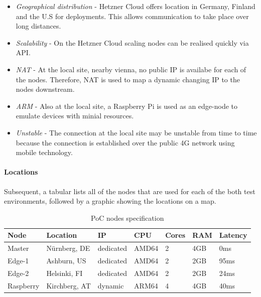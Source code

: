 \documentclass[MSC,Master,english]{twbook}%
\begin{document}
\begin{itemize}
    \item \textit{Geographical distribution} - Hetzner Cloud offers location in Germany, Finland and the U.S for deployments. This allows communication to take place over long distances.
    \item \textit{Scalability} - On the Hetzner Cloud scaling nodes can be realised quickly via \ac{API}.
    \item \textit{\ac{NAT}} - At the local site, nearby vienna, no public IP is availabe for each of the nodes. Therefore, \ac{NAT} is used to map a dynamic changing IP to the nodes downstream.
    \item \textit{\ac{ARM}} - Also at the local site, a Raspberry Pi is used as an edge-node to emulate devices with minial resources.
    \item \textit{Unstable} - The connection at the local site may be unstable from time to time because the connection is established over the public 4G network using mobile technology.
\end{itemize}

\paragraph{Locations} Subsequent, a tabular lists all of the nodes that are used for each of the both test environments, followed by a graphic showing the locations on a map.

\begin{table}[ht]
    \begin{center}
        \begin{tabular}{|l|l|l|l|l|l|l|}
            \hline
            Node & Location & IP & CPU & Cores & RAM & Latency \\
            \hline
            Master & Nürnberg, DE & dedicated & AMD64 & 2 & 4GB & 0ms \\
            Edge-1 & Ashburn, US & dedicated & AMD64 & 2 & 2GB & 95ms \\
            Edge-2 & Helsinki, FI & dedicated & AMD64 & 2 & 2GB & 24ms \\
            Raspberry & Kirchberg, AT & dynamic & ARM64 & 4 & 4GB & 40ms \\
            \hline
        \end{tabular}
        \caption{\ac{PoC} nodes specification}
        \label{tab:poc-nodes}
    \end{center}
\end{table}
\end{document}
